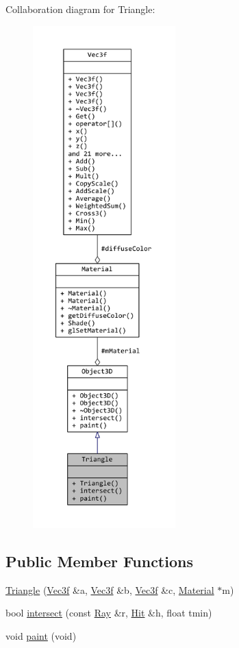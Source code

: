 Collaboration diagram for Triangle\+:
\nopagebreak
\begin{figure}[H]
\begin{center}
\leavevmode
\includegraphics[height=550pt]{classTriangle__coll__graph}
\end{center}
\end{figure}
\subsection*{Public Member Functions}
\begin{DoxyCompactItemize}
\item 
\hyperlink{classTriangle_a47f7f8c2e0fdd8eeb9a0da704f5ccbe4}{Triangle} (\hyperlink{classVec3f}{Vec3f} \&a, \hyperlink{classVec3f}{Vec3f} \&b, \hyperlink{classVec3f}{Vec3f} \&c, \hyperlink{classMaterial}{Material} $\ast$m)
\item 
bool \hyperlink{classTriangle_a3e0979b60f7008812146905eace0f0e5}{intersect} (const \hyperlink{classRay}{Ray} \&r, \hyperlink{classHit}{Hit} \&h, float tmin)
\item 
void \hyperlink{classTriangle_af772b7c0c43f99ff1b6dbcee8c3723fd}{paint} (void)
\end{DoxyCompactItemize}
